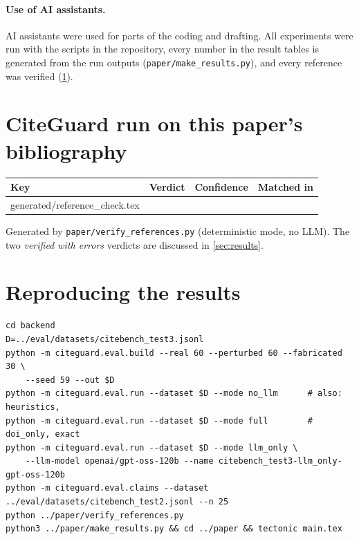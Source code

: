 \documentclass[10pt,twocolumn,a4paper]{article}
\makeatletter
\newcommand{\tabinput}[1]{\@@input #1 }  %
\makeatother
\begin{document}
\paragraph{Use of AI assistants.}
AI assistants were used for parts of the coding and drafting. All experiments were run with the
scripts in the repository, every number in the result tables is generated from the run outputs
(\texttt{paper/make\_results.py}), and every reference was verified (\cref{app:selfcheck}).

{\small


}

\appendix
\onecolumn
\section{CiteGuard run on this paper's bibliography}
\label{app:selfcheck}
\begin{center}
\small
\begin{tabular}{@{}llcl@{}}
\toprule
Key & Verdict & Confidence & Matched in \\
\midrule
\tabinput{generated/reference_check.tex}
\bottomrule
\end{tabular}
\end{center}
Generated by \texttt{paper/verify\_references.py} (deterministic mode, no LLM). The two
\emph{verified with errors} verdicts are discussed in \cref{sec:results}.

\section{Reproducing the results}
\begin{verbatim}
cd backend
D=../eval/datasets/citebench_test3.jsonl
python -m citeguard.eval.build --real 60 --perturbed 60 --fabricated 30 \
    --seed 59 --out $D
python -m citeguard.eval.run --dataset $D --mode no_llm      # also: heuristics,
python -m citeguard.eval.run --dataset $D --mode full        #   doi_only, exact
python -m citeguard.eval.run --dataset $D --mode llm_only \
    --llm-model openai/gpt-oss-120b --name citebench_test3-llm_only-gpt-oss-120b
python -m citeguard.eval.claims --dataset ../eval/datasets/citebench_test2.jsonl --n 25
python ../paper/verify_references.py
python3 ../paper/make_results.py && cd ../paper && tectonic main.tex
\end{verbatim}
\end{document}
